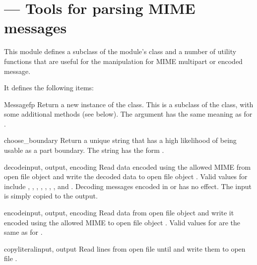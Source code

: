 \section{ ---
         Tools for parsing MIME messages}



This module defines a subclass of the
 module's
 class and a number of utility functions that are
useful for the manipulation for MIME multipart or encoded message.

It defines the following items:

\begin{classdesc}{Message}{fp}
Return a new instance of the  class.  This is a
subclass of the  class, with some additional
methods (see below).  The  argument has the same meaning
as for .
\end{classdesc}

\begin{funcdesc}{choose_boundary}{}
Return a unique string that has a high likelihood of being usable as a
part boundary.  The string has the form
.
\end{funcdesc}

\begin{funcdesc}{decode}{input, output, encoding}
Read data encoded using the allowed MIME  from open file
object  and write the decoded data to open file object
.  Valid values for  include
, , ,
, , , , and 
.  Decoding messages encoded in  or 
has no effect.  The input is simply copied to the output.
\end{funcdesc}

\begin{funcdesc}{encode}{input, output, encoding}
Read data from open file object  and write it encoded using
the allowed MIME  to open file object .
Valid values for  are the same as for .
\end{funcdesc}

\begin{funcdesc}{copyliteral}{input, output}
Read lines from open file  until \EOF{} and write them to
open file .
\end{funcdesc}

